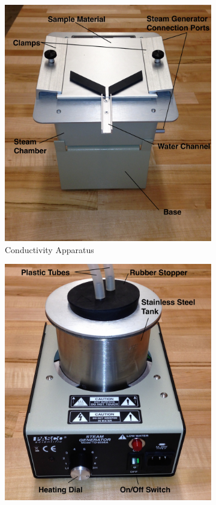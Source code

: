 \begin{figure}
	\centering
	\begin{subfigure}{0.48\textwidth}
		\includegraphics[width=\textwidth]{./Exp10/pic/condapppic.jpeg}
		\caption{Conductivity Apparatus}
		\label{condexp1}
	\end{subfigure}
\begin{subfigure}{0.48\textwidth}
	\centering
	\includegraphics[width=\textwidth]{./Exp10/pic/steamchamberpic.jpeg}

\end{subfigure}
\end{figure}
